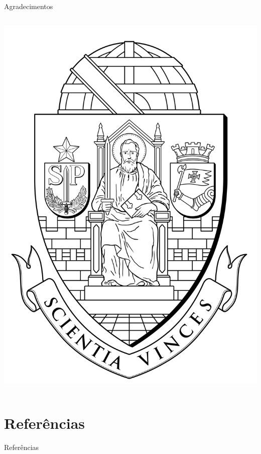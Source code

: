\documentclass{beamer}
\begin{document}
\begin{frame}{Agradecimentos}
{\begin{columns}
\begin{column}{0.4\textwidth}
      \includegraphics[width=\columnwidth]{figuras/brasao_usp_pb}
    \end{column}
  \end{columns}
  }
\end{frame}
\section{Referências}
\nocite{*}
\begin{frame}[allowframebreaks]{Referências}
  \tiny
  
  
\end{frame}
\begin{frame}[plain]
  \maketitle
\end{frame}
\end{document}
